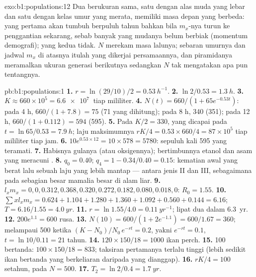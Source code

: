 \begin{solution}{exo:b1:populations:12}
Dua  berukuran sama, satu dengan alas muda yang lebar dan satu
dengan kelas umur yang merata, memiliki masa depan yang berbeda: yang
pertama akan tumbuh berpuluh tahun bahkan bila $m_x$-nya turun ke
penggantian sekarang, sebab banyak yang mudanya belum berbiak
(momentum demografi); yang kedua tidak. $N$ merekam masa lalunya;
sebaran umurnya dan jadwal $m_x$ di atasnya itulah yang dikerjai
persamaannya, dan piramidanya meramalkan ukuran generasi berikutnya
sedangkan $N$ tak mengatakan apa pun tentangnya.
\end{solution}

\begin{solution}{pb:b1:populations:1}
\textbf{1.} $r = \ln(29/10)/2 = \qty{0.53}{h^{-1}}$.
\textbf{2.} $\ln 2/0.53 = \qty{1.3}{h}$.
\textbf{3.} $K \approx 660\times 10^5 = \qty{6.6e7}{}$  tiap
mililiter.
\textbf{4.} $N(t) = 660/(1 + 65e^{-0.53t})$: pada 4 h, $660/(1 + 7.8) =
75$ (71 yang dihitung); pada 8 h, 340 (351); pada 12 h, $660/(1 + 0.112) = 594$
(595).
\textbf{5.} Pada $K/2 = 330$, yang dicapai pada $t = \ln 65/0.53 = \qty{7.9}{h}$;
laju maksimumnya $rK/4 = 0.53\times 660/4 = 87\times 10^5$  tiap
mililiter tiap jam.
\textbf{6.} $10e^{0.53\times 12} = 10\times 578 = 5780$: sepuluh kali
595 yang teramati.
\textbf{7.} Habisnya gulanya (atau oksigennya); bertimbunnya
etanol dan asam yang meracuni .
\textbf{8.} $q_0 = 0.40$; $q_4 = 1 - 0.34/0.40 = 0.15$: kematian awal
yang berat lalu sebuah laju yang lebih mantap --- antara jenis II dan
III, sebagaimana pada sebagian besar mamalia besar di alam liar.
\textbf{9.} $l_x m_x = 0, 0, 0.312, 0.368, 0.320, 0.272, 0.182, 0.080,
0.018, 0$: $R_0 = 1.55$.
\textbf{10.} $\sum x l_x m_x = 0.624 + 1.104 + 1.280 + 1.360 + 1.092 +
0.560 + 0.144 = 6.16$; $T = 6.16/1.55 = \qty{4.0}{yr}$.
\textbf{11.} $r = \ln 1.55/4.0 = \qty{0.11}{yr^{-1}}$; lipat dua dalam
\qty{6.3}{yr}.
\textbf{12.} $200e^{1.1} = 600$ rusa.
\textbf{13.} $N(10) = 600/(1 + 2e^{-1.1}) = 600/1.67 = 360$; melampaui 500
ketika $(K - N_0)/N_0\,e^{-rt} = 0.2$, yakni $e^{-rt} = 0.1$, $t = \ln
10/0.11 = 21$ tahun.
\textbf{14.} $120\times 150/18 = 1000$ ikan perch.
\textbf{15.} 100 bertanda: $100\times 150/18 = 833$; taksiran pertamanya
terlalu tinggi (lebih sedikit ikan bertanda yang berkeliaran daripada
yang dianggap).
\textbf{16.} $rK/4 = 100$ setahun, pada $N = 500$.
\textbf{17.} $T_2 = \ln 2/0.4 = \qty{1.7}{yr}$.

\end{solution}
